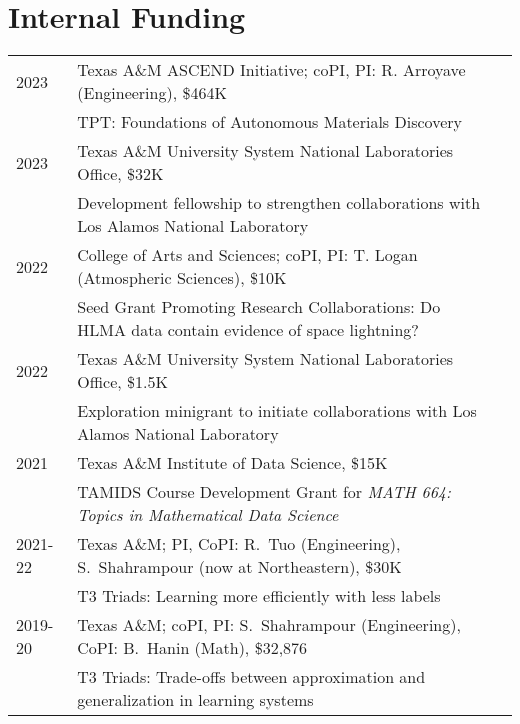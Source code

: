 \documentclass[11pt]{article}
\begin{document}
\section{Internal Funding}

\begin{tabular}{lll}
2023 & Texas A\&M ASCEND Initiative; coPI, PI: R. Arroyave (Engineering), \$464K\\
& \hspace{-15mm}
{\small TPT:} Foundations of Autonomous Materials Discovery\\
2023 & Texas A\&M University System National Laboratories Office, \$32K\\
& \hspace{-15mm}
Development fellowship to strengthen collaborations with Los Alamos National Laboratory\\
2022 & College of Arts and Sciences;
coPI, PI: T. Logan (Atmospheric Sciences),  \$10K\\
& \hspace{-15mm}
{\small Seed Grant Promoting Research Collaborations:}
Do HLMA data contain evidence of space lightning?\\
2022 & Texas A\&M University System National Laboratories Office, \$1.5K\\
& \hspace{-15mm}
Exploration minigrant to initiate collaborations with Los Alamos National Laboratory\\
2021 & Texas A\&M Institute of Data Science, \$15K\\
& \hspace{-15mm}
TAMIDS Course Development Grant for {\em MATH 664: Topics in Mathematical Data Science}\\
2021-22 & Texas A\&M; PI,  CoPI: R.~Tuo (Engineering), S.~Shahrampour (now at Northeastern), \$30K\\
& \hspace{-15mm}
{\small T3 Triads:} Learning more efficiently with less labels\\
2019-20 & Texas A\&M; coPI, PI: S.~Shahrampour (Engineering), CoPI: B.~Hanin (Math), \$32,876\\
& \hspace{-15mm}
{\small T3 Triads:} Trade-offs between approximation and generalization in learning systems
\end{tabular}
\end{document}
